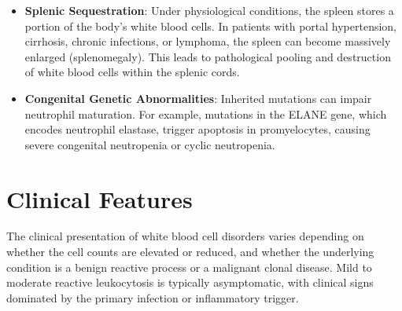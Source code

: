 \begin{itemize}
  \item \textbf{Splenic Sequestration}: Under physiological conditions, the spleen stores a portion of the body's white blood cells. In patients with portal hypertension, cirrhosis, chronic infections, or lymphoma, the spleen can become massively enlarged (splenomegaly). This leads to pathological pooling and destruction of white blood cells within the splenic cords.
  \item \textbf{Congenital Genetic Abnormalities}: Inherited mutations can impair neutrophil maturation. For example, mutations in the ELANE gene, which encodes neutrophil elastase, trigger apoptosis in promyelocytes, causing severe congenital neutropenia or cyclic neutropenia.
\end{itemize}

\section*{Clinical Features}
The clinical presentation of white blood cell disorders varies depending on whether the cell counts are elevated or reduced, and whether the underlying condition is a benign reactive process or a malignant clonal disease. Mild to moderate reactive leukocytosis is typically asymptomatic, with clinical signs dominated by the primary infection or inflammatory trigger.

